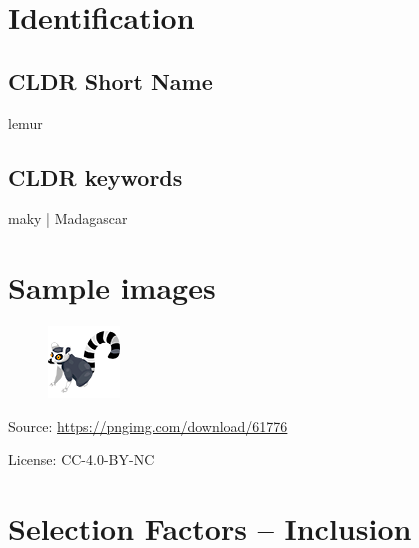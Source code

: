 \documentclass{article}
\begin{document}

\section{Identification}
\subsection{CLDR Short Name}
lemur

\subsection{CLDR keywords}
maky | Madagascar

\section{Sample images}

\begin{figure}[h]
  \includegraphics{lemur.png}
\end{figure}

Source: \url{https://pngimg.com/download/61776}

License: CC-4.0-BY-NC

\section{Selection Factors -- Inclusion}
\end{document}
